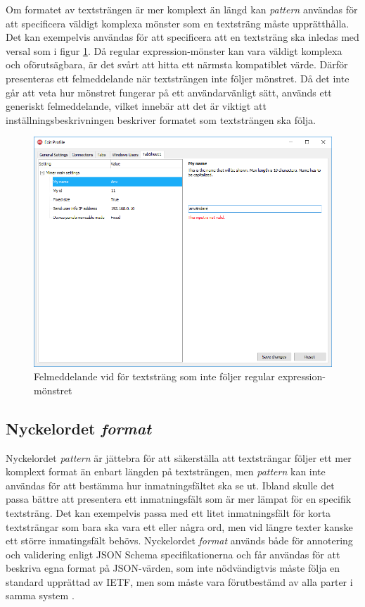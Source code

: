 Om formatet av textsträngen är mer komplext än längd kan \textit{pattern} användas för att specificera väldigt komplexa mönster som en textsträng måste upprätthålla. Det kan exempelvis användas för att specificera att en textsträng ska inledas med versal som i figur \ref{fig:textstrang-pattern}. Då regular expression-mönster kan vara väldigt komplexa och oförutsägbara, är det svårt att hitta ett närmsta kompatiblet värde. Därför presenteras ett felmeddelande när textsträngen inte följer mönstret. Då det inte går att veta hur mönstret fungerar på ett användarvänligt sätt, används ett generiskt felmeddelande, vilket innebär att det är viktigt att inställningsbeskrivningen beskriver formatet som textsträngen ska följa.

\begin{figure}
	\includegraphics[width=\textwidth]{./images/gui/textstrang-pattern.png}
	\vspace{-1.7em}
	\caption{Felmeddelande vid för textsträng som inte följer regular expression-mönstret}
	\label{fig:textstrang-pattern}
\end{figure}

\FloatBarrier
\subsection{Nyckelordet \textit{format}}

Nyckelordet \textit{pattern} är jättebra för att säkerställa att textsträngar följer ett mer komplext format än enbart längden på textsträngen, men \textit{pattern} kan inte användas för att bestämma hur inmatningsfältet ska se ut. Ibland skulle det passa bättre att presentera ett inmatningsfält som är mer lämpat för en specifik textsträng. Det kan exempelvis passa med ett litet inmatningsfält för korta textsträngar som bara ska vara ett eller några ord, men vid längre texter kanske ett större inmatingsfält behövs. Nyckelordet \textit{format} används både för annotering och validering enligt JSON Schema specifikationerna och får användas för att beskriva egna format på JSON-värden, som inte nödvändigtvis måste följa en standard upprättad av IETF, men som måste vara förutbestämd av alla parter i samma system \cite{Andrews2018}.

